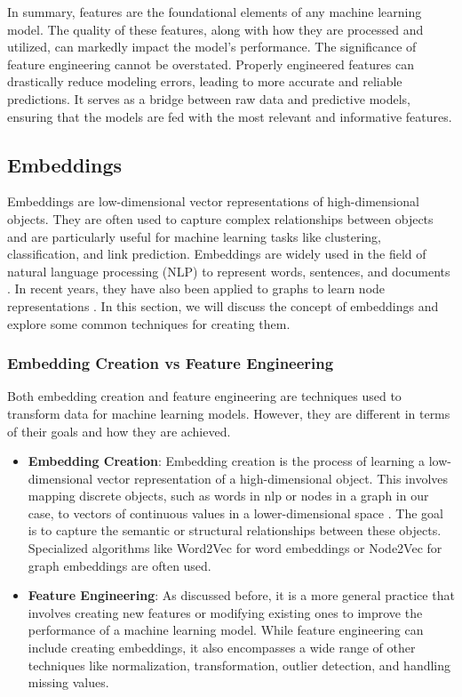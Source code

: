     In summary, features are the foundational elements of any machine learning model. The quality of these features, along with how they are processed and utilized, can markedly impact the model's performance. The significance of feature engineering cannot be overstated. Properly engineered features can drastically reduce modeling errors, leading to more accurate and reliable predictions. It serves as a bridge between raw data and predictive models, ensuring that the models are fed with the most relevant and informative features.

    \subsection{Embeddings}
    Embeddings are low-dimensional vector representations of high-dimensional objects. They are often used to capture complex relationships between objects and are particularly useful for machine learning tasks like clustering, classification, and link prediction. Embeddings are widely used in the field of natural language processing (NLP) to represent words, sentences, and documents \cite{UnderstandingWordEmbeddingsAndLM20}. In recent years, they have also been applied to graphs to learn node representations \cite{KG21}. In this section, we will discuss the concept of embeddings and explore some common techniques for creating them.
    
    \subsubsection{Embedding Creation vs Feature Engineering}    
    Both embedding creation and feature engineering are techniques used to transform data for machine learning models. However, they are different in terms of their goals and how they are achieved.

    \begin{itemize}
        \item \textbf{Embedding Creation}: Embedding creation is the process of learning a low-dimensional vector representation of a high-dimensional object. This involves mapping discrete objects, such as words in \acrfull{nlp} or nodes in a graph in our case, to vectors of continuous values in a lower-dimensional space \cite{UnderstandingWordEmbeddingsAndLM20}. The goal is to capture the semantic or structural relationships between these objects. Specialized algorithms like Word2Vec for word embeddings or Node2Vec for graph embeddings are often used.
        
        \item \textbf{Feature Engineering}: As discussed before, it is a more general practice that involves creating new features or modifying existing ones to improve the performance of a machine learning model. While feature engineering can include creating embeddings, it also encompasses a wide range of other techniques like normalization, transformation, outlier detection, and handling missing values.
    \end{itemize}

